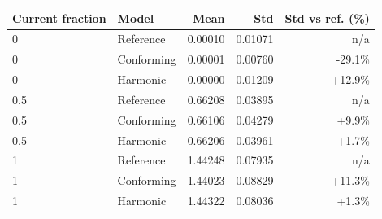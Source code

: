 \begin{tabular}{llrrr}\toprule
Current fraction & Model & Mean & Std & Std vs ref. (\%)\\\midrule
0 & Reference & 0.00010 & 0.01071 & n/a \\
0 & Conforming & 0.00001 & 0.00760 & -29.1\% \\
0 & Harmonic & 0.00000 & 0.01209 & +12.9\% \\
0.5 & Reference & 0.66208 & 0.03895 & n/a \\
0.5 & Conforming & 0.66106 & 0.04279 & +9.9\% \\
0.5 & Harmonic & 0.66206 & 0.03961 & +1.7\% \\
1 & Reference & 1.44248 & 0.07935 & n/a \\
1 & Conforming & 1.44023 & 0.08829 & +11.3\% \\
1 & Harmonic & 1.44322 & 0.08036 & +1.3\% \\
\bottomrule\end{tabular}
